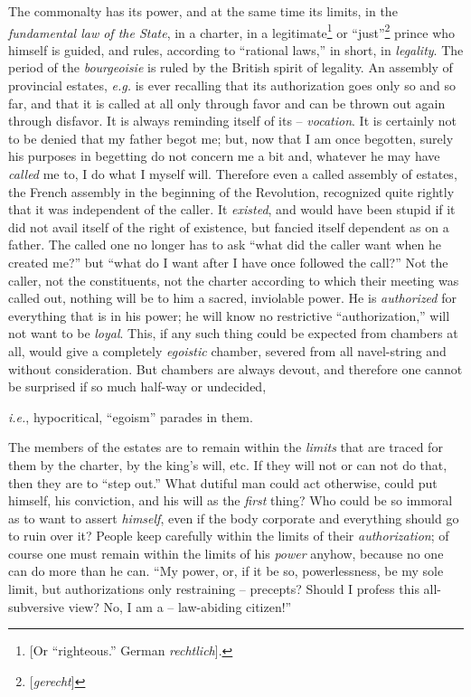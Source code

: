 \documentclass[12pt,a4paper]{book}
\begin{document}
The commonalty has its power, and at the same time its limits, in the 
\textit{fundamental law of the State}, in a charter, in a 
legitimate\footnote{[Or ``righteous.'' German \textit{rechtlich}].} or 
``just''\footnote{[\textit{gerecht}]} prince who himself is guided, and 
rules, according to ``rational laws,'' in short, in \textit{legality}. The 
period of the \textit{bourgeoisie} is ruled by the British spirit of legality. 
An assembly of provincial estates, \textit{e.g.} is ever recalling that its 
authorization goes only so and so far, and that it is called at all only 
through favor and can be thrown out again through disfavor. It is always 
reminding itself of its -- \textit{vocation}. It is certainly not to be denied 
that my father begot me; but, now that I am once begotten, surely his purposes 
in begetting do not concern me a bit and, whatever he may have \textit{called} 
me to, I do what I myself will. Therefore even a called assembly of estates, 
the French assembly in the beginning of the Revolution, recognized quite 
rightly that it was independent of the caller. It \textit{existed}, and would 
have been stupid if it did not avail itself of the right of existence, but 
fancied itself dependent as on a father. The called one no longer has to ask 
``what did the caller want when he created me?'' but ``what do I want after 
I have once followed the call?'' Not the caller, not the constituents, not 
the charter according to which their meeting was called out, nothing will be 
to him a sacred, inviolable power. He is \textit{authorized} for everything 
that is in his power; he will know no restrictive ``authorization,'' will 
not want to be \textit{loyal}. This, if any such thing could be expected from 
chambers at all, would give a completely \textit{egoistic} chamber, severed 
from all navel-string and without consideration. But chambers are always 
devout, and therefore one cannot be surprised if so much half-way or 
undecided,

\textit{i.e.}, hypocritical, ``egoism'' parades in them.

The members of the estates are to remain within the \textit{limits} that are 
traced for them by the charter, by the king's will, etc. If they will not or 
can not do that, then they are to ``step out.'' What dutiful man could act 
otherwise, could put himself, his conviction, and his will as the 
\textit{first} thing? Who could be so immoral as to want to assert 
\textit{himself}, even if the body corporate and everything should go to ruin 
over it? People keep carefully within the limits of their 
\textit{authorization}; of course one must remain within the limits of his 
\textit{power} anyhow, because no one can do more than he can. ``My power, 
or, if it be so, powerlessness, be my sole limit, but authorizations only 
restraining -- precepts? Should I profess this all-subversive view? No, I am a 
-- law-abiding citizen!''
\end{document}
